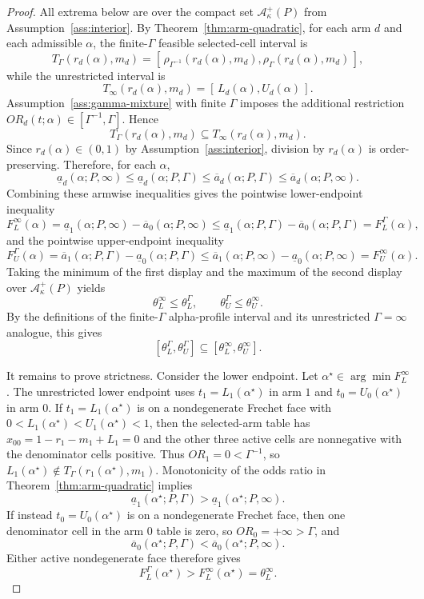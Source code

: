\begin{proof}
All extrema below are over the compact set \(\mathcal A_\kappa^+(P)\) from Assumption~\ref{ass:interior}.  By Theorem~\ref{thm:arm-quadratic}, for each arm \(d\) and each admissible \(\alpha\), the finite-\(\Gamma\) feasible selected-cell interval is
\[
  T_\Gamma(r_d(\alpha),m_d)
  =
  [\,\rho_{\Gamma^{-1}}(r_d(\alpha),m_d),\rho_\Gamma(r_d(\alpha),m_d)\,],
\]
while the unrestricted interval is
\[
  T_\infty(r_d(\alpha),m_d)
  =
  [\,L_d(\alpha),U_d(\alpha)\,].
\]
Assumption~\ref{ass:gamma-mixture} with finite \(\Gamma\) imposes the additional restriction \(OR_d(t;\alpha)\in[\Gamma^{-1},\Gamma]\).  Hence
\[
  T_\Gamma(r_d(\alpha),m_d)\subseteq T_\infty(r_d(\alpha),m_d).
\]
Since \(r_d(\alpha)\in(0,1)\) by Assumption~\ref{ass:interior}, division by \(r_d(\alpha)\) is order-preserving.  Therefore, for each \(\alpha\),
\[
  \underline a_d(\alpha;P,\infty)
  \le
  \underline a_d(\alpha;P,\Gamma)
  \le
  \overline a_d(\alpha;P,\Gamma)
  \le
  \overline a_d(\alpha;P,\infty).
\]
Combining these armwise inequalities gives the pointwise lower-endpoint inequality
\[
  F_L^\infty(\alpha)
  =
  \underline a_1(\alpha;P,\infty)-\overline a_0(\alpha;P,\infty)
  \le
  \underline a_1(\alpha;P,\Gamma)-\overline a_0(\alpha;P,\Gamma)
  =
  F_L^\Gamma(\alpha),
\]
and the pointwise upper-endpoint inequality
\[
  F_U^\Gamma(\alpha)
  =
  \overline a_1(\alpha;P,\Gamma)-\underline a_0(\alpha;P,\Gamma)
  \le
  \overline a_1(\alpha;P,\infty)-\underline a_0(\alpha;P,\infty)
  =
  F_U^\infty(\alpha).
\]
Taking the minimum of the first display and the maximum of the second display over \(\mathcal A_\kappa^+(P)\) yields
\[
  \theta_L^\infty\le \theta_L^\Gamma,
  \qquad
  \theta_U^\Gamma\le \theta_U^\infty.
\]
By the definitions of the finite-\(\Gamma\) alpha-profile interval and its unrestricted \(\Gamma=\infty\) analogue, this gives
\[
  [\theta_L^\Gamma,\theta_U^\Gamma]\subseteq[\theta_L^\infty,\theta_U^\infty].
\]

It remains to prove strictness.  Consider the lower endpoint.  Let \(\alpha^\star\in\arg\min F_L^\infty\).  The unrestricted lower endpoint uses \(t_1=L_1(\alpha^\star)\) in arm \(1\) and \(t_0=U_0(\alpha^\star)\) in arm \(0\).  If \(t_1=L_1(\alpha^\star)\) is on a nondegenerate Frechet face with \(0<L_1(\alpha^\star)<U_1(\alpha^\star)<1\), then the selected-arm table has \(x_{00}=1-r_1-m_1+L_1=0\) and the other three active cells are nonnegative with the denominator cells positive.  Thus \(OR_1=0<\Gamma^{-1}\), so \(L_1(\alpha^\star)\notin T_\Gamma(r_1(\alpha^\star),m_1)\).  Monotonicity of the odds ratio in Theorem~\ref{thm:arm-quadratic} implies
\[
  \underline a_1(\alpha^\star;P,\Gamma)
  >
  \underline a_1(\alpha^\star;P,\infty).
\]
If instead \(t_0=U_0(\alpha^\star)\) is on a nondegenerate Frechet face, then one denominator cell in the arm \(0\) table is zero, so \(OR_0=+\infty>\Gamma\), and
\[
  \overline a_0(\alpha^\star;P,\Gamma)
  <
  \overline a_0(\alpha^\star;P,\infty).
\]
Either active nondegenerate face therefore gives
\[
  F_L^\Gamma(\alpha^\star)>F_L^\infty(\alpha^\star)=\theta_L^\infty.
\]


\end{proof}
